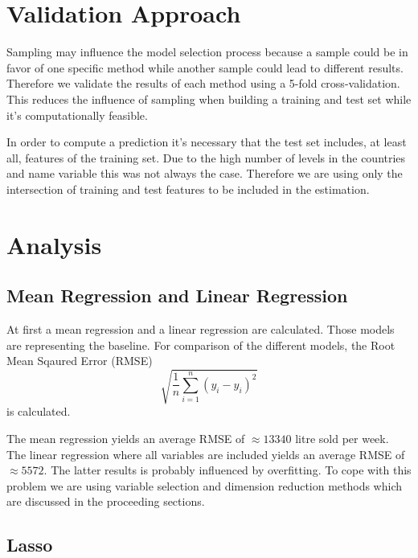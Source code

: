 \documentclass[11pt,]{article}
\begin{document}
\hypertarget{validation-approach}{%
\section{Validation Approach}\label{validation-approach}}

Sampling may influence the model selection process because a sample
could be in favor of one specific method while another sample could lead
to different results. Therefore we validate the results of each method
using a 5-fold cross-validation. This reduces the influence of sampling
when building a training and test set while it's computationally
feasible.

In order to compute a prediction it's necessary that the test set
includes, at least all, features of the training set. Due to the high
number of levels in the countries and name variable this was not always
the case. Therefore we are using only the intersection of training and
test features to be included in the estimation.

\hypertarget{analysis}{%
\section{Analysis}\label{analysis}}

\hypertarget{mean-regression-and-linear-regression}{%
\subsection{Mean Regression and Linear
Regression}\label{mean-regression-and-linear-regression}}

At first a mean regression and a linear regression are calculated. Those
models are representing the baseline. For comparison of the different
models, the Root Mean Sqaured Error (RMSE)
\[\sqrt{\frac{1}{n}\sum_{i = 1}^{n}\left(y_i-\hat{y}_i\right)^2}\] is
calculated.

The mean regression yields an average RMSE of \(\approx 13340\) litre
sold per week. The linear regression where all variables are included
yields an average RMSE of \(\approx 5572\). The latter results is
probably influenced by overfitting. To cope with this problem we are
using variable selection and dimension reduction methods which are
discussed in the proceeding sections.

\hypertarget{lasso}{%
\subsection{Lasso}\label{lasso}}
\end{document}
